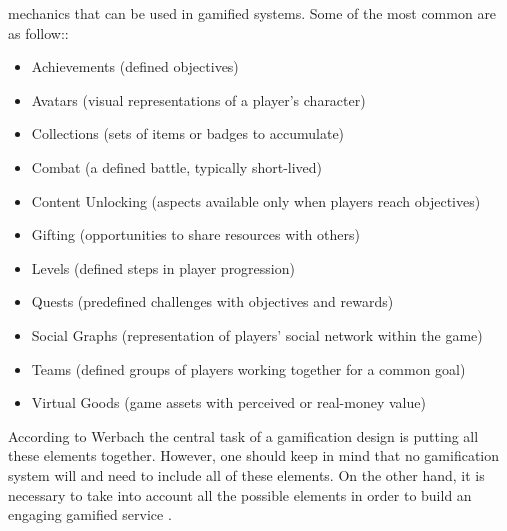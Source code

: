 mechanics that can be used in gamified systems. Some of the most common are as follow:\cite{zichermann2011gamification}:
\begin{itemize}
\item Achievements (defined objectives)
\item Avatars (visual representations of a player's character)
\item Collections (sets of items or badges to accumulate)
\item Combat (a defined battle, typically short-lived)
\item Content Unlocking (aspects available only when players reach objectives)
\item Gifting (opportunities to share resources with others)
\item Levels (defined steps in player progression)
\item Quests (predefined challenges with objectives and rewards)
\item Social Graphs (representation of players' social network within the game)
\item Teams (defined groups of players working together for a common goal)
\item Virtual Goods (game assets with perceived or real-money value)
\end{itemize}
According to Werbach the central task of a gamification design is putting all these elements together. However, one should keep in mind that no gamification system will and need to include all of these elements. On the other hand, it is necessary to take into account all the possible elements in order to build an engaging gamified service \cite{werbach2012win}. 
